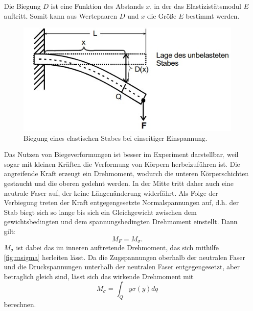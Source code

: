 Die Biegung $D$ ist eine Funktion des Abstands $x$, in der das Elastizistätsmodul $E$ auftritt. Somit kann aus Wertepaaren $D$ und $x$ die Größe $E$ bestimmt werden.
\begin{figure}[H]
    \includegraphics[width=\linewidth]{img/abb2.jpg}
    \caption{Biegung eines elastischen Stabes bei einseitiger Einspannung.\cite{V103}}
    \label{fig:biegung}
\end{figure}
Das Nutzen von Biegeverformungen ist besser im Experiment darstellbar, weil sogar mit kleinen Kräften die Verformung von Körpern herbeizuführen ist.
Die angreifende Kraft erzeugt  ein Drehmoment, wodurch die unteren Körperschichten gestaucht und die oberen gedehnt werden.
In der Mitte tritt daher auch eine neutrale Faser auf, der keine Längenänderung widerfährt.
Als Folge der Verbiegung treten der Kraft entgegengesetzte Normalspannungen auf, d.h. der Stab biegt sich so lange bis sich ein Gleichgewicht zwischen dem
gewichtsbedingten und dem spannungsbedingten Drehmoment einstellt. Dann gilt:
\begin{equation*}
    M_F = M_{\sigma}.
\end{equation*}
$M_{\sigma}$ ist dabei das im inneren auftretende Drehmoment, das sich mithilfe \autoref{fig:msigma} herleiten lässt. Da die Zugspannungen oberhalb der neutralen
Faser und die Druckspannungen unterhalb der neutralen Faser entgegengesetzt, aber betraglich gleich sind, lässt sich das wirkende Drehmoment mit
\begin{equation*}
    M_{\sigma} = \int_{Q} y\sigma(y) dq
\end{equation*}
berechnen.\\
